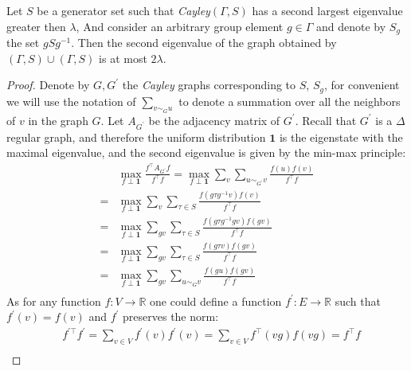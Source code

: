 \begin{claim} Let $S$ be a generator set such that \emph{Cayley}$\left( \Gamma , S \right)$ has a second largest eigenvalue greater then $\lambda$, And consider an arbitrary group element $g \in \Gamma$ and denote by $S_{g}$ the set $gSg^{-1}$. Then the second eigenvalue of the graph obtained by $\left( \Gamma, S \right) \cup \left( \Gamma, S \right)$ is at most $2\lambda$. \end{claim}
\begin{proof} Denote by $G,G^{\prime}$ the \emph{Cayley} graphs corresponding to $S$, $S_{g}$, for convenient we will use the notation of $\sum_{v\sim_{G} u}$ to denote a summation over all the neighbors of $v$ in the graph $G$. Let $A_{G^{\prime}}$ be the adjacency matrix of $G^{\prime}$. Recall that $G^{\prime}$ is a  $\Delta$ regular graph, and therefore the uniform distribution $\mathbf{1}$ is the eigenstate with the maximal eigenvalue, and the second eigenvalue is given by the min-max principle: 
  \begin{equation*}
    \begin{split}
      & \max_{f \perp \mathbf{1}} { \frac{f^{\top}A_{G^{\prime}} f  }{ f^{\top}f}} = \max_{f \perp \mathbf{1}} { \sum_{v}  \sum_{u\sim_{G^{\prime}} v}\frac{f\left( u \right) f \left( v \right)  }{ f^{\top}f}} \\
      =  & \max_{f \perp \mathbf{1}} { \sum_{v}\sum_{\tau \in S} \frac{f\left( g\tau g^{-1} v \right) f \left( v \right)  }{ f^{\top}f}} \\ = & \max_{f \perp \mathbf{1}} { \sum_{gv} \sum_{\tau \in S}\frac{f\left( g\tau g^{-1} gv \right) f \left( gv \right)  }{ f^{\top}f}} \\  
      = & \max_{f \perp \mathbf{1}} { \sum_{gv}\sum_{\tau \in S}\frac{f\left( g \tau v \right) f \left( g v \right)  }{ f^{\top}f}} \\  = & \max_{f \perp \mathbf{1}} { \sum_{gv}\sum_{ u\sim_{G} v }\frac{f\left( gu \right) f \left( gv \right)  }{ f^{\top}f}} \\
    \end{split}
  \end{equation*}
  As for any function $f : V \rightarrow \mathbb{R} $ one could define a function $f^{\prime} : E \rightarrow \mathbb{R} $ such that $f^{\prime}\left( v \right) = f\left( v \right) $ and $f^{\prime}$ preserves the norm:    
  \begin{equation*}
    \begin{split}
      &  f^{\prime \top}f^{\prime}   = \sum_{v \in V}f^{\prime}\left( v \right)f^{\prime}\left( v \right)   =   \sum_{v \in V } f^{\top}\left( vg \right)f\left( vg \right) = f^{\top}f \\

\end{split}
\end{equation*}
\end{proof}
